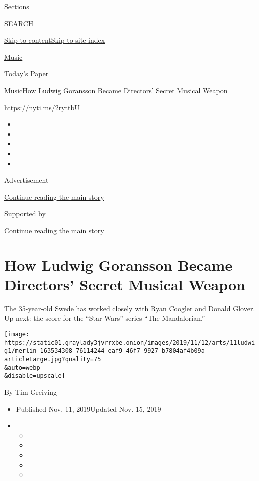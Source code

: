 Sections

SEARCH

\protect\hyperlink{site-content}{Skip to
content}\protect\hyperlink{site-index}{Skip to site index}

\href{https://www.nytimes3xbfgragh.onion/section/arts/music}{Music}

\href{https://myaccount.nytimes3xbfgragh.onion/auth/login?response_type=cookie\&client_id=vi}{}

\href{https://www.nytimes3xbfgragh.onion/section/todayspaper}{Today's
Paper}

\href{/section/arts/music}{Music}\textbar{}How Ludwig Goransson Became
Directors' Secret Musical Weapon

\url{https://nyti.ms/2ryttbU}

\begin{itemize}
\item
\item
\item
\item
\item
\end{itemize}

Advertisement

\protect\hyperlink{after-top}{Continue reading the main story}

Supported by

\protect\hyperlink{after-sponsor}{Continue reading the main story}

\hypertarget{how-ludwig-goransson-became-directors-secret-musical-weapon}{%
\section{How Ludwig Goransson Became Directors' Secret Musical
Weapon}\label{how-ludwig-goransson-became-directors-secret-musical-weapon}}

The 35-year-old Swede has worked closely with Ryan Coogler and Donald
Glover. Up next: the score for the ``Star Wars'' series ``The
Mandalorian.''

\texttt{[image: https://static01.graylady3jvrrxbe.onion/images/2019/11/12/arts/11ludwig1/merlin\_163534308\_76114244-eaf9-46f7-9927-b7804af4b09a-articleLarge.jpg?quality=75\\\&auto=webp\\\&disable=upscale]}

By Tim Greiving

\begin{itemize}
\item
  Published Nov. 11, 2019Updated Nov. 15, 2019
\item
  \begin{itemize}
  \item
  \item
  \item
  \item
  \item
  \end{itemize}
\end{itemize}

